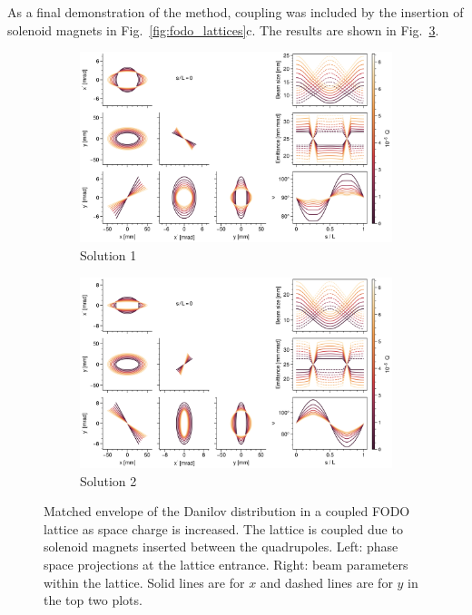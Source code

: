 As a final demonstration of the method, coupling was included by the insertion of solenoid magnets in Fig.~\ref{fig:fodo_lattices}c. The results are shown in Fig.~\ref{fig:matched_vs_sc_fodo_sol}.
%
\begin{figure}[!p]
    \begin{subfigure}{1.0\textwidth}
        \includegraphics[width=\textwidth]{Images/chapter2/matched_vs_sc_fodo_sol_mode1.png}
        \caption{Solution 1}
        \label{fig:matched_vs_sc_fodo_sol_a}
    \end{subfigure}
    \vfill
    \vfill
    \begin{subfigure}{1.0\textwidth}
        \centering
        \includegraphics[width=\textwidth]{Images/chapter2/matched_vs_sc_fodo_sol_mode2.png}
        \caption{Solution 2}
        \label{fig:matched_vs_sc_fodo_sol_b}
    \end{subfigure}
    \caption{Matched envelope of the Danilov distribution in a coupled FODO lattice as space  charge is increased. The lattice is coupled due to solenoid magnets inserted between the quadrupoles. Left: phase space projections at the lattice entrance. Right: beam parameters within the lattice. Solid lines are for $x$ and dashed lines are for $y$ in the top two plots.}
    \label{fig:matched_vs_sc_fodo_sol}
\end{figure}
